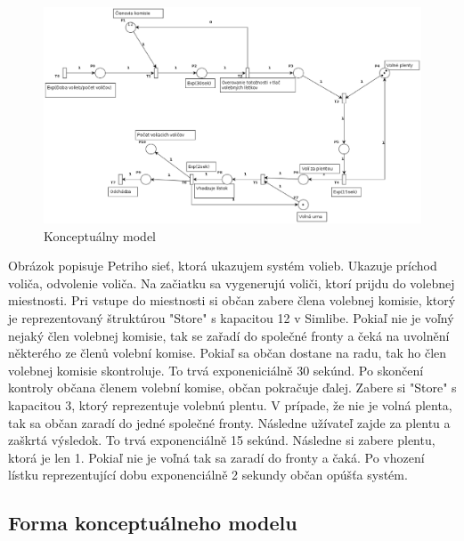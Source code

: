 \documentclass[12pt,a4paper,titlepage,final]{article}
\begin{document}
\newpage 
\begin{figure}[h]

\begin{center}

\includegraphics[scale=0.4]{img/petri2.eps} 
\caption{Konceptuálny model}
\label{koncept}

\end{center}

\end{figure}

Obrázok popisuje Petriho sieť, ktorá ukazujem systém volieb. Ukazuje príchod voliča, odvolenie voliča. Na začiatku sa vygenerujú voliči, ktorí prijdu do volebnej miestnosti. Pri vstupe do miestnosti si občan zabere člena volebnej komisie, ktorý je reprezentovaný štruktúrou "Store" s kapacitou 12 v Simlibe. Pokiaľ nie je voľný nejaký člen volebnej komisie, tak se zařadí do společné fronty a čeká na uvolnění některého ze členů volební komise. Pokiaľ sa občan dostane na radu, tak ho člen volebnej komisie skontroluje. To trvá exponeniciálně 30 sekúnd. Po skončení kontroly občana členem volební komise, občan pokračuje ďalej. Zabere si "Store" s kapacitou 3, ktorý reprezentuje volebnú plentu. V prípade, že nie je volná plenta, tak sa občan zaradí do jedné společné fronty. Následne užívateľ zajde za plentu a zaškrtá výsledok. To trvá exponenciálně 15 sekúnd. Následne si zabere plentu, ktorá je len 1. Pokiaľ nie je voľná tak sa zaradí do fronty a čaká. Po vhození lístku reprezentující dobu exponenciálně 2 sekundy občan opúšťa systém.
\newpage


\subsection{Forma konceptuálneho modelu}
\end{document}
